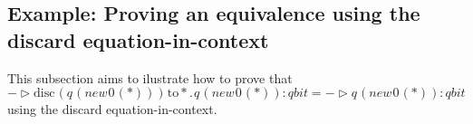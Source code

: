   \subsection{Example: Proving an equivalence using the discard equation-in-context}

This subsection aims to ilustrate how to prove that
\begin{equation}
  - \triangleright \text{disc} \hspace{1pt} (q \hspace{1pt} (\textit{new}\hspace{1pt}0 \hspace{1pt}(*))) \hspace{1pt} \text{to} *. \hspace{1pt} q \hspace{1pt} (\textit{new}\hspace{1pt}0 \hspace{1pt}(*)): \textit{qbit} = - \triangleright q \hspace{1pt} (\textit{new}\hspace{1pt}0 \hspace{1pt}(*)): \textit{qbit} 
\end{equation}
using the discard equation-in-context.

